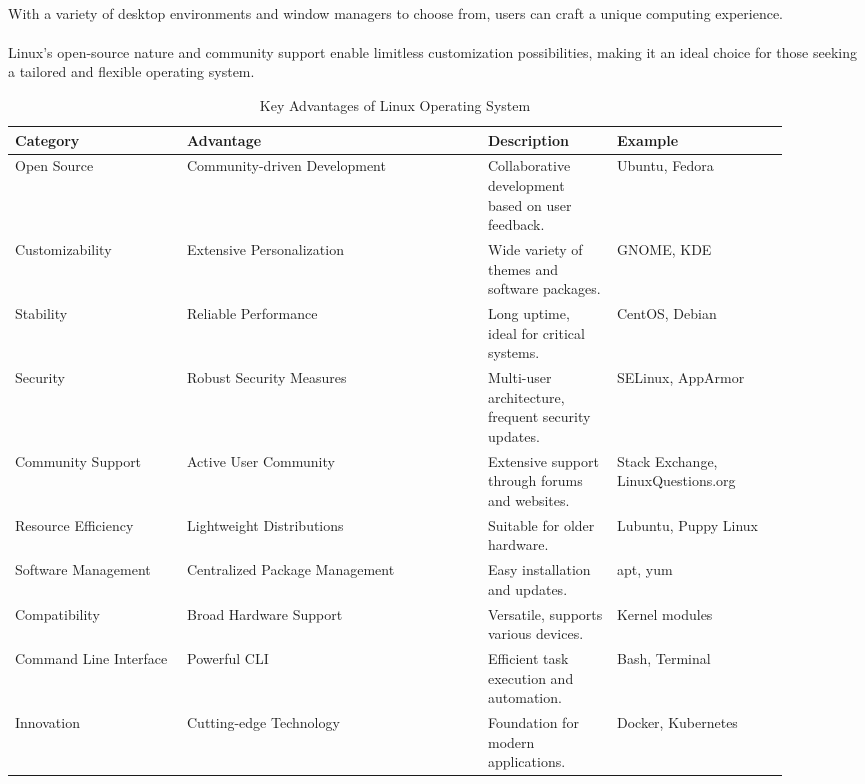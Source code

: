 \documentclass{article}
\begin{document}
\paragraph{}
With a variety of desktop environments and window managers to choose from, users can craft a unique computing experience.
\paragraph{}
Linux's open-source nature and community support enable limitless customization possibilities, making it an ideal choice for those seeking a tailored and flexible operating system.

\begin{table}[H]
\centering
\begin{tabular}{|m{0.2\linewidth}|m{0.35\linewidth}|m{0.15\linewidth}|m{0.2\linewidth}|}
\hline
\textbf{Category} & \textbf{Advantage} & \textbf{Description} & \textbf{Example} \\
\hline
Open Source & Community-driven Development & Collaborative development based on user feedback. & Ubuntu, Fedora \\
\hline
Customizability & Extensive Personalization & Wide variety of themes and software packages. & GNOME, KDE \\
\hline
Stability & Reliable Performance & Long uptime, ideal for critical systems. & CentOS, Debian \\
\hline
Security & Robust Security Measures & Multi-user architecture, frequent security updates. & SELinux, AppArmor \\
\hline
Community Support & Active User Community & Extensive support through forums and websites. & Stack Exchange, LinuxQuestions.org \\
\hline
Resource Efficiency & Lightweight Distributions & Suitable for older hardware. & Lubuntu, Puppy Linux \\
\hline
Software Management & Centralized Package Management & Easy installation and updates. & apt, yum \\
\hline
Compatibility & Broad Hardware Support & Versatile, supports various devices. & Kernel modules \\
\hline
Command Line Interface & Powerful CLI & Efficient task execution and automation. & Bash, Terminal \\
\hline
Innovation & Cutting-edge Technology & Foundation for modern applications. & Docker, Kubernetes \\
\hline
\end{tabular}
\caption{Key Advantages of Linux Operating System}
\label{tab:linux_advantages}
\end{table}
\end{document}
